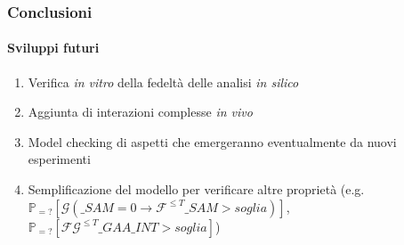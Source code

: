 \begin {frame}
\frametitle {Conclusioni}
\framesubtitle{Sviluppi futuri}
\begin{enumerate}
	\item Verifica \emph{in vitro} della fedelt\`a delle analisi \emph{in silico}
	\item Aggiunta di interazioni complesse \emph{in vivo}
	\item Model checking di aspetti che emergeranno eventualmente da nuovi esperimenti
	\item Semplificazione del modello per verificare altre propriet\`a (e.g. $\mathbb{P}_{=?} [\mathcal{G} (\_SAM = 0 \rightarrow \mathcal{F}^{\leq T} \_SAM > soglia)]$, $\mathbb{P}_{=?} [\mathcal{F}\mathcal{G}^{\leq T} \_GAA\_INT > soglia]$)
\end{enumerate}

\end{frame}
